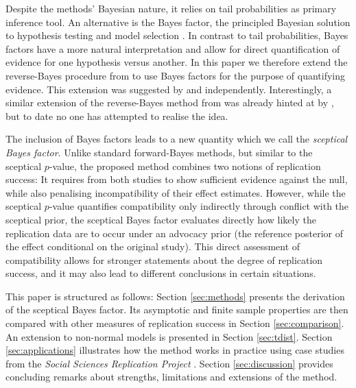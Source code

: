 Despite the methods' Bayesian nature, it relies on tail probabilities as primary
inference tool. An alternative is the Bayes factor, the principled Bayesian
solution to hypothesis testing and model selection \citep{Jeffreys1961,
Kass1995}. In contrast to tail probabilities, Bayes factors have a more natural
interpretation and allow for direct quantification of evidence for one
hypothesis versus another. In this paper we therefore extend the reverse-Bayes
procedure from \citet{Held2020} to use Bayes factors for the purpose of
quantifying evidence. This extension was suggested by \citet{Consonni2019} and
\citet{Pericchi2020} independently. Interestingly, a similar extension of the
reverse-Bayes method from \citet{Matthews2001b} was already hinted at by
\citet{Berger2001}, but to date no one has attempted to realise the idea.

The inclusion of Bayes factors leads to a new quantity which we call the
\emph{sceptical Bayes factor}. Unlike standard forward-Bayes methods, but
similar to the sceptical $p$-value, the proposed method combines two notions of
replication success: It requires from both studies to show sufficient evidence
against the null, while also penalising incompatibility of their effect
estimates. However, while the sceptical $p$-value quantifies compatibility only
indirectly through conflict with the sceptical prior, the sceptical Bayes factor
evaluates directly how likely the replication data are to occur under an
advocacy prior (the reference posterior of the effect conditional on the
original study). This direct assessment of compatibility allows for stronger
statements about the degree of replication success, and it may also lead to
different conclusions in certain situations.

This paper is structured as follows: Section \ref{sec:methods} presents the
derivation of the sceptical Bayes factor. Its asymptotic and finite sample
properties are then compared with other measures of replication success in
Section \ref{sec:comparison}. An extension to non-normal models is presented in
Section \ref{sec:tdist}. Section \ref{sec:applications} illustrates how the
method works in practice using case studies from the \emph{Social Sciences
  Replication Project} \citep{Camerer2018}. Section \ref{sec:discussion}
provides concluding remarks about strengths, limitations and extensions of the
method.

